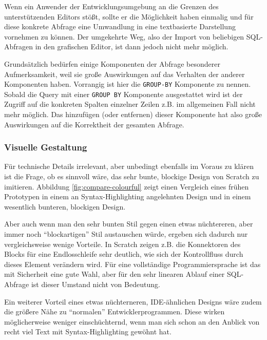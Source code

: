 Wenn ein Anwender der Entwicklungsumgebung an die Grenzen des unterstützenden Editors stößt, sollte er die Möglichkeit haben einmalig und für diese konkrete Abfrage eine Umwandlung in eine textbasierte Darstellung vornehmen zu können. Der umgekehrte Weg, also der Import von beliebigen SQL-Abfragen in den grafischen Editor, ist dann jedoch nicht mehr möglich.

Grundsätzlich bedürfen einige Komponenten der Abfrage besonderer Aufmerksamkeit, weil sie große Auswirkungen auf das Verhalten der anderer Komponenten haben. Vorrangig ist hier die \texttt{GROUP-BY} Komponente zu nennen. Sobald die Query mit einer \texttt{GROUP BY} Komponente ausgestattet wird ist der Zugriff auf die konkreten Spalten einzelner Zeilen z.B. im allgemeinen Fall nicht mehr möglich. Das hinzufügen (oder entfernen) dieser Komponente hat also große Auswirkungen auf die Korrektheit der gesamten Abfrage.

\subsubsection{Visuelle Gestaltung}

Für technische Details irrelevant, aber unbedingt ebenfalls im Voraus zu klären ist die Frage, ob es sinnvoll wäre, das sehr bunte, blockige Design von Scratch zu imitieren. Abbildung \ref{fig:compare-colourful} zeigt einen Vergleich eines frühen Prototypen in einem an Syntax-Highlighting angelehnten Design und in einem wesentlich bunteren, blockigen Design.


Aber auch wenn man den sehr bunten Stil gegen einen etwas nüchtereren, aber immer noch ``blockartigen'' Stil austauschen würde, ergeben sich dadurch nur vergleichsweise wenige Vorteile. In Scratch zeigen z.B. die Konnektoren des Blocks für eine Endlosschleife sehr deutlich, wie sich der Kontrollfluss durch dieses Element verändern wird. Für eine vollständige Programmiersprache ist das mit Sicherheit eine gute Wahl, aber für den sehr linearen Ablauf einer SQL-Abfrage ist dieser Umstand nicht von Bedeutung.

Ein weiterer Vorteil eines etwas nüchterneren, IDE-ähnlichen Designs wäre zudem die größere Nähe zu ``normalen'' Entwicklerprogrammen. Diese wirken möglicherweise weniger einschüchternd, wenn man sich schon an den Anblick von recht viel Text mit Syntax-Highlighting gewöhnt hat.

